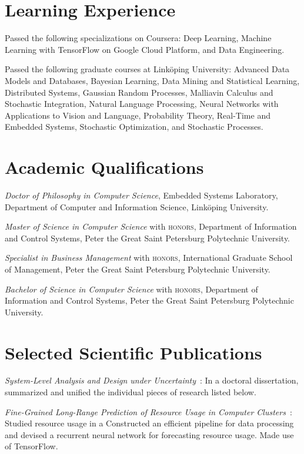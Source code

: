\documentclass[journal]{IEEEtran}
\begin{document}
\section{Learning Experience} 

\date{2018--2019} Passed the following specializations on Coursera: Deep
Learning, Machine Learning with TensorFlow on Google Cloud Platform, and Data
Engineering.

\date{2011--2017} Passed the following graduate courses at Linköping University:
Advanced Data Models and Databases, Bayesian Learning, Data Mining and
Statistical Learning, Distributed Systems, Gaussian Random Processes, Malliavin
Calculus and Stochastic Integration, Natural Language Processing, Neural
Networks with Applications to Vision and Language, Probability Theory, Real-Time
and Embedded Systems, Stochastic Optimization, and Stochastic Processes.

\section{Academic Qualifications} 

\date{2017} \emph{Doctor of Philosophy in Computer Science}, Embedded Systems
Laboratory, Department of Computer and Information Science, Linköping
University.

\date{2010} \emph{Master of Science in Computer Science} with \textsc{honors},
Department of Information and Control Systems, Peter the Great Saint Petersburg
Polytechnic University.

\date{2010} \emph{Specialist in Business Management} with \textsc{honors},
International Graduate School of Management, Peter the Great Saint Petersburg
Polytechnic University.

\date{2008} \emph{Bachelor of Science in Computer Science} with \textsc{honors},
Department of Information and Control Systems, Peter the Great Saint Petersburg
Polytechnic University.

\section{Selected Scientific Publications} 

\date{2017} \emph{System-Level Analysis and Design under
Uncertainty}~\cite{ukhov2017d}: In a doctoral dissertation, summarized and
unified the individual pieces of research listed below.

\date{2017} \emph{Fine-Grained Long-Range Prediction of Resource Usage in
Computer Clusters}~\cite{ukhov2017b}: Studied resource usage in a
 Constructed
an efficient pipeline for data processing and devised a recurrent neural network
for forecasting resource usage. Made use of TensorFlow.
\end{document}
